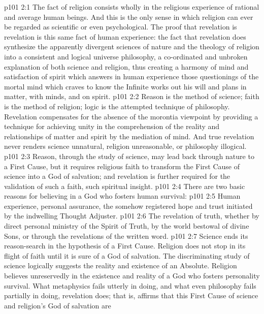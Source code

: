 \vs p101 2:1 The fact of religion consists wholly in the religious experience of rational and average human beings. And this is the only sense in which religion can ever be regarded as scientific or even psychological. The proof that revelation is revelation is this same fact of human experience: the fact that revelation does synthesize the apparently divergent sciences of nature and the theology of religion into a consistent and logical universe philosophy, a co\hyp{}ordinated and unbroken explanation of both science and religion, thus creating a harmony of mind and satisfaction of spirit which answers in human experience those questionings of the mortal mind which craves to know  the Infinite works out his will and plans in matter, with minds, and on spirit.
\vs p101 2:2 Reason is the method of science; faith is the method of religion; logic is the attempted technique of philosophy. Revelation compensates for the absence of the morontia viewpoint by providing a technique for achieving unity in the comprehension of the reality and relationships of matter and spirit by the mediation of mind. And true revelation never renders science unnatural, religion unreasonable, or philosophy illogical.
\vs p101 2:3 Reason, through the study of science, may lead back through nature to a First Cause, but it requires religious faith to transform the First Cause of science into a God of salvation; and revelation is further required for the validation of such a faith, such spiritual insight.
\vs p101 2:4 There are two basic reasons for believing in a God who fosters human survival:
\vs p101 2:5 \bibnobreakspace Human experience, personal assurance, the somehow registered hope and trust initiated by the indwelling Thought Adjuster.
\vs p101 2:6 \bibnobreakspace The revelation of truth, whether by direct personal ministry of the Spirit of Truth, by the world bestowal of divine Sons, or through the revelations of the written word.
\vs p101 2:7 \pc Science ends its reason\hyp{}search in the hypothesis of a First Cause. Religion does not stop in its flight of faith until it is sure of a God of salvation. The discriminating study of science logically suggests the reality and existence of an Absolute. Religion believes unreservedly in the existence and reality of a God who fosters personality survival. What metaphysics fails utterly in doing, and what even philosophy fails partially in doing, revelation does; that is, affirms that this First Cause of science and religion’s God of salvation are 
